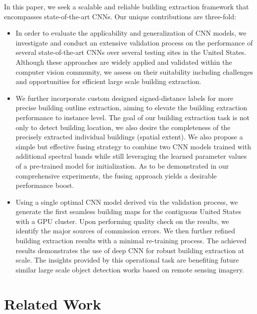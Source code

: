 \documentclass[journal]{IEEEtran}
\begin{document}
In this paper, we seek a scalable and reliable building extraction framework that encompasses state-of-the-art CNNs. Our unique contributions are three-fold: 
\begin{itemize}

	\item In order to evaluate the applicability and generalization of CNN models, we investigate and conduct an extensive validation process on the performance of several state-of-the-art CNNs over several testing sites in the United States. Although these approaches are widely applied and validated within the computer vision community, we assess on their suitability including challenges and opportunities for efficient large scale building extraction.
	\item We further incorporate custom designed signed-distance labels for more precise building outline extraction, aiming to elevate the building extraction performance to instance level. The goal of our building extraction task is not only to detect building location, we also desire the completeness of the  precisely extracted individual buildings (spatial extent). We also propose a simple but effective fusing strategy to combine two CNN models trained with additional spectral bands while still leveraging the learned parameter values of a pre-trained model for initialization. As to be demonstrated in our comprehensive experiments, the fusing approach yields a desirable performance boost.
	
	\item Using a single optimal CNN model derived via the validation process, we generate the first seamless building maps for the contiguous United States with a GPU cluster. Upon performing quality check on the results, we identify the major sources of commission errors. We then further refined building extraction results with a minimal re-training process. The achieved results demonstrates the use of deep CNN for robust building extraction at scale.  The insights provided by this operational task are benefiting future similar large scale object detection works based on remote sensing imagery.
\end{itemize}




\section{Related Work}
\end{document}
